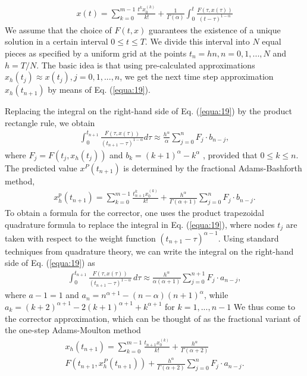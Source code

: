 \documentclass[10pt]{article}
\begin{document}
\begin{multicols}{2}
\begin{align}
    x(t) = \sum_{k=0}^{m-1} \frac{t^k x_0^{(k)}}{k!} + \frac{1}{\Gamma (\alpha)} \int_0^t \frac{F(\tau , x(\tau))}{(t- \tau)^{1-\alpha}} \label{equa:19}
\end{align}
We assume that the choice of $F(t, x)$ guarantees the existence of a unique solution in a certain interval $0 \le t \le T$. We divide this interval into $N$ equal pieces as specified by a uniform grid at the points $t_n = hn, n = 0, 1, . . . , N$ and $h = T / N$. The basic idea is that using pre-calculated approximations $x_h(t_j ) \approx x(t_j ), j = 0, 1, . . . , n$, we get the next time step approximation $x_h(t_{n+1})$ by means of Eq. (\ref{equa:19}). \par
Replacing the integral on the right-hand side of Eq. (\ref{equa:19}) by the product rectangle rule, we obtain
\begin{align}
    \int_0^{t_{n+1}} \frac{F(\tau , x(\tau))}{(t_{n+1}-\tau)^{1-\alpha}}d\tau \approx \frac{h^\alpha}{\alpha} \sum_{j=0}^n F_j \cdot b_{n-j}, \label{equa:20}
\end{align}
where $F_j = F(t_j , x_h(t_j))$ and $b_k = (k + 1)^\alpha - k^\alpha$ , provided that $0 \le k \le n$. The predicted value $x^P (t_{n+1})$ is determined by the fractional Adams-Bashforth method,
\begin{align}
   x_h^p (t_{n+1}) = \sum_{k=0}^{m-1} \frac{t_{n+1}^k x_0^{(k)}}{k!} + \frac{h^\alpha}{\Gamma (\alpha + 1)} \sum_{j=0}^n F_j \cdot b_{n-j}. \label{equa:1}
\end{align}
To obtain a formula for the corrector, one uses the product trapezoidal quadrature formula to replace the integral in Eq. (\ref{equa:19}), where nodes $t_j$ are taken with respect to the weight function $(t_{n+1} - \tau)^{\alpha - 1}$. Using standard techniques from quadrature theory, we can write the integral on the right-hand side of Eq. (\ref{equa:19}) as
\begin{align}
   \int_0^{t_{n+1}} \frac{F(\tau,x(\tau))}{(t_{n+1}-\tau)^{1-\alpha}}\,d\tau \approx \frac{h^\alpha}{\alpha(\alpha + 1)} \sum_{j=0}^{n+1} F_j \cdot a_{n-j},
\end{align}
where $a-1 = 1$ and $a_n = n^{\alpha + 1}-(n-\alpha)(n+1)^\alpha$, while $a_k = (k+2)^{\alpha + 1} - 2(k+1)^{\alpha + 1} + k^{\alpha + 1}$ for $k = 1, ..., n-1$ We thus come to the corrector approximation, which can be thought of as the fractional variant of the one-step Adams-Moulton method
\begin{align}
   x_h(t_{n+1})=\sum_{k=0}^{m-1} \frac{t_{n+1}x_0^{(k)}}{k!} + \frac{h^\alpha}{\Gamma (\alpha + 2)} \\ F(t_{n+1}, x_h^P (t_{n+1})) + \frac{h^\alpha}{\Gamma (\alpha + 2)} \sum_{j=0}^n F_j \cdot a_{n-j}.

\end{align}
\end{multicols}
\end{document}

